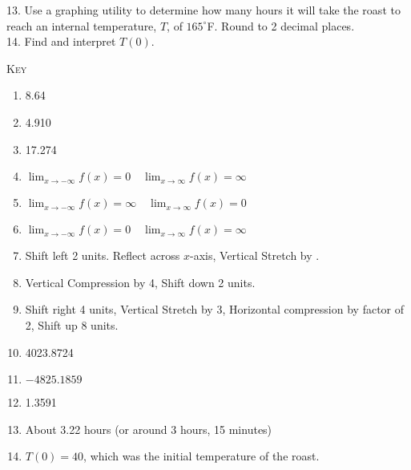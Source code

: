 \documentclass[11pt]{article}
\begin{document}
13. Use a graphing utility to determine how many hours it will take the roast to reach an internal temperature, $T$, of $165^\circ$F. Round to 2 decimal places.   \\[0.5in]

14. Find and interpret $T(0)$.


\newpage

\textsc{Key}
\begin{enumerate}
    \item 8.64
    \item 4.910
    \item 17.274
    
    \item $\lim_{x\to -\infty} f(x) = 0 \quad \lim_{x\to \infty} f(x) = \infty$
    
    \item $\lim_{x\to -\infty} f(x) = \infty \quad \lim_{x\to \infty} f(x) = 0$
    
    \item $\lim_{x\to -\infty} f(x) = 0 \quad \lim_{x\to \infty} f(x) = \infty$
    
    \item Shift left 2 units. Reflect across $x$-axis, Vertical Stretch by . \\ 
    
    \item Vertical Compression by 4, Shift down 2 units. \\
    
    \item Shift right 4 units, Vertical Stretch by 3, Horizontal compression by factor of 2, Shift up 8 units. \\
    
    \item 4023.8724
    \item $-4825.1859$
    \item 1.3591
    
    \item About 3.22 hours (or around 3 hours, 15 minutes)
    
    \item $T(0) = 40$, which was the initial temperature of the roast.
\end{enumerate}
\end{document}
